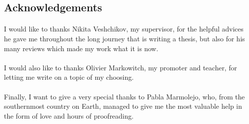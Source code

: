 \begin{vcenterpage}
\section*{Acknowledgements}
\paragraph{}
I would like to thanks Nikita Veshchikov, my supervisor, for the helpful advices he gave me throughout the long journey that is writing a thesis, but also for his many reviews which made my work what it is now. 
\paragraph{}
I would also like to thanks Olivier Markowitch, my promoter and teacher, for letting me write on a topic of my choosing. 
\paragraph{}
Finally, I want to give a very special thanks to Pabla Marmolejo, who, from the southernmost country on Earth, managed to give me the most valuable help in the form of love and hours of proofreading.
\end{vcenterpage}